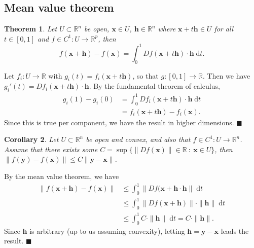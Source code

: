 \documentclass[letter-paper]{tufte-book}
\newtheorem{theorem}{\color{pastel-blue}Theorem}[section]
\newtheorem{corollary}[theorem]{\color{pastel-blue}Corollary}
\newenvironment{proof}[1][Proof]{\begin{trivlist}
\item[\hskip \labelsep {\bfseries #1}]}{\end{trivlist}}
\newcommand{\qed}{\hfill$\blacksquare$}
\begin{document}

\subsection{Mean value theorem}

\begin{theorem}
  Let $U \subset \mathbb{R}^n$ be open, $\boldsymbol{x} \in U$, $\boldsymbol{h}
  \in \mathbb{R}^n$ where $\boldsymbol{x} + t\boldsymbol{h} \in U$ for all $t
  \in [0, 1]$ and $f \in C^1 : U \to \mathbb{R}^p$, then
  \begin{equation*}
    f(\boldsymbol{x} + \boldsymbol{h}) - f(\boldsymbol{x}) = \int^1_0 Df(\boldsymbol{x} + t\boldsymbol{h})\cdot\boldsymbol{h}\; \mathrm{d}t.
  \end{equation*}
\end{theorem}

\begin{proof}
  Let $f_i : U \to \mathbb{R}$ with $g_i(t) = f_i(\boldsymbol{x} +
  t\boldsymbol{h})$, so that $g : [0, 1] \to \mathbb{R}$. Then we have $g_i'(t)
  = Df_i(\boldsymbol{x} + t\boldsymbol{h}) \cdot \boldsymbol{h}$. By the
  fundamental theorem of calculus,
  \begin{align*}
    g_i(1) - g_i(0) &= \int_0^1 Df_i(\boldsymbol{x} + t\boldsymbol{h}) \cdot \boldsymbol{h}\; \mathrm{d}t \\
      &= f_i(\boldsymbol{x} + t\boldsymbol{h}) - f_i(\boldsymbol{x}).
  \end{align*}
  Since this is true per component, we have the result in higher dimensions. \qed
\end{proof}

\begin{corollary}
  Let $U \subset \mathbb{R}^n$ be open and convex, and also that $f \in C^1 : U
  \to \mathbb{R}^n$. Assume that there exists some $C = \sup
  \{\|Df(\boldsymbol{x})\| \in \mathbb{R}\ :\ \boldsymbol{x} \in U\}$, then
  $\|f(\boldsymbol{y}) - f(\boldsymbol{x})\| \leq C\|\boldsymbol{y} -
  \boldsymbol{x}\|$.
\end{corollary}

\begin{proof}
  By the mean value theorem, we have
  \begin{align*}
    \|f(\boldsymbol{x} + \boldsymbol{h}) - f(\boldsymbol{x})\| &\leq \int_0^1 \|Df(\boldsymbol{x} + \boldsymbol{h} \cdot \boldsymbol{h}\|\; \mathrm{d}t\\
      &\leq \int_0^1 \|Df(\boldsymbol{x} + \boldsymbol{h})\| \cdot \|\boldsymbol{h}\|\; \mathrm{d}t\\
      &\leq \int_0^1 C \cdot \|\boldsymbol{h}\|\; \mathrm{d}t = C \cdot \|\boldsymbol{h}\|.
  \end{align*}
  Since $\boldsymbol{h}$ is arbitrary (up to us assuming convexity), letting
  $\boldsymbol{h} = \boldsymbol{y} - \boldsymbol{x}$ leads the result. \qed
\end{proof}
\end{document}
